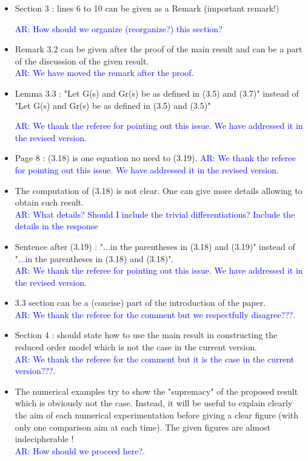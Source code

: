 \documentclass[11pt]{article}
\def\serkan#1{\textcolor{blue}{{#1}}}
\begin{document}
\begin{itemize}
\item Section 3 : lines 6 to 10 can be given as a Remark (important remark!) 

\serkan{\textsf{AR}:  How should we organize (reorganize?) this section? }

\item Remark 3.2 can be given after the proof of the main result and can be
a part of the discussion of the given result. \\
\serkan{\textsf{AR}:  We have moved the remark after the proof. }

\item Lemma 3.3 : "Let G(s) and Gr(s) be as defined in (3.5) and (3.7)"
instead of "Let G(s) and Gr(s) be as defined in (3.5) and (3.5)"

\serkan{\textsf{AR}:  We thank the referee for pointing out this issue. We have addressed it in the revised version.}

\item Page 8 : (3.18) is one equation no need to (3.19).
\serkan{\textsf{AR}:  We thank the referee for pointing out this issue. We have addressed it in the revised version.}

\item The computation of (3.18) is not clear. One can give more details
allowing to obtain such result. \\
\serkan{\textsf{AR}:  What details? Should I include the trivial differentiations? Include the details in the response}

\item Sentence after (3.19) : "...in the parentheses in (3.18) and (3.19)"
instead of "...in the parentheses in (3.18) and (3.18)". \\

\serkan{\textsf{AR}:  We thank the referee for pointing out this issue. We have addressed it in the revised version.}

\item 3.3 section can be a (concise) part of the introduction of the paper. \\
\serkan{\textsf{AR}:  We thank the referee for the comment but we respectfully disagree???.}

\item Section 4 : should state how to use the main result in constructing
the reduced order model which is not the case in the current version.\\
\serkan{\textsf{AR}:  We thank the referee for the comment but it is the case in the current version???.}

\item The numerical examples try to show the "supremacy" of the proposed
result which is obviously not the case. Instead, it will be useful to
explain clearly the aim of each numerical experimentation before giving
a clear figure (with only one comparison aim at each time). The given
figures are almost indecipherable !\\

\serkan{\textsf{AR}:  How should we proceed here?.}

\end{itemize}
\end{document}
